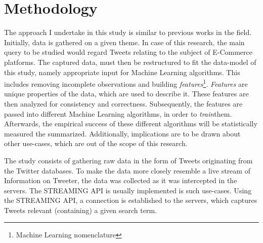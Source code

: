 \section{Methodology}
	The approach I undertake in this study is similar to previous works in the field. Initially, data is gathered on a given theme. In case of this research, the main query to be studied would regard Tweets relating to the subject of E-Commerce platforms. The captured data, must then be restructured to fit the data-model of this study, namely appropriate input for Machine Learning algorithms. This includes removing incomplete observations and building \textit{features}\footnote{\label{ml_note}Machine Learning nomenclature}. \textit{Features} are unique properties of the data, which are used to describe it. These features are then analyzed for consistency and correctness. Subsequently, the features are passed into different Machine Learning algorithms, in order to \textit{train}\footnotemark[1] them. Afterwards, the empirical success of these different algorithms will be statistically measured the summarized. Additionally, implications are to be drawn about other use-cases, which are out of the scope of this research. 
	
	The study consists of gathering raw data in the form of Tweets originating from the Twitter databases. To make the data more closely resemble a live stream of Information on Tweeter, the data was collected as it was intercepted in the servers. The STREAMING API is usually implemented is such use-cases. Using the STREAMING API, a connection is established to the servers, which captures Tweets relevant (containing) a given search term. 
	
	
	